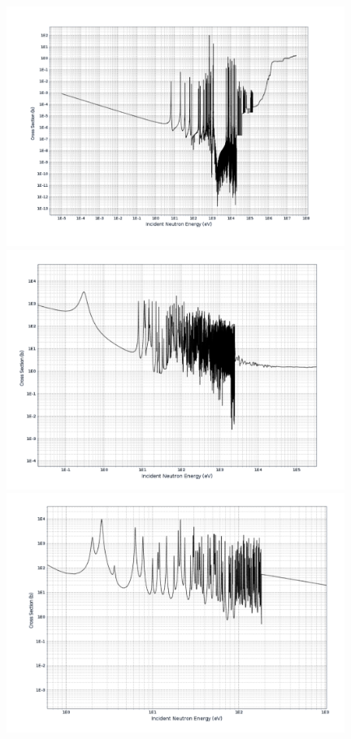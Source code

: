 \documentclass{report}
\begin{document}
\begin{center}
\includegraphics[width=11cm]{u238_fission.png}\\
\includegraphics[width=11cm]{pu239_fission.png}\\
\includegraphics[width=11cm]{gd155_absorption.png}\\

\end{center}
\end{document}
